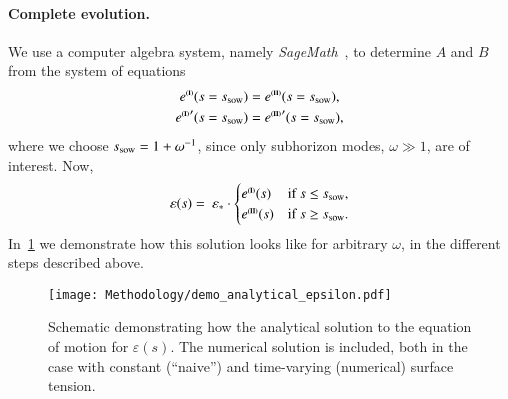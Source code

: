     \paragraph{Complete evolution.} %
    We use a computer algebra system, namely \textit{SageMath}~\citep{sagemath}, to determine $A$ and $B$ from the system of equations
    \begin{equation}
        \begin{split}
            e^{\text{{\tiny{\textbf{(I)}}}}}(s=s_\mathrm{sow}) &= e^{\text{{\tiny{\textbf{(II)}}}}}(s=s_\mathrm{sow}), \\
            {e^{\text{{\tiny{\textbf{(I)}}}}}}'(s=s_\mathrm{sow}) &= {e^{\text{{\tiny{\textbf{(II)}}}}}}'(s=s_\mathrm{sow}),
        \end{split}
    \end{equation}
    where we choose $s_\mathrm{sow}=1+\omega^{-1}$, since only subhorizon modes, $\omega\gg 1$, are of interest. Now,
    \begin{equation}\label{eq:pertwalls:mywalls:eps_s_complete_MD}
        \varepsilon(s) =  \epsast \cdot \begin{cases}
            e^{\text{\eqregimenum{I}}} (s)  &\text{if } s \leq s\ped{sow}, \\
            e^{\text{\eqregimenum{II}}}(s)  &\text{if }  s \geq s\ped{sow}.
        \end{cases}
    \end{equation}
    In~\cref{fig:pertwalls:mywalls:demo_analytical_epsilon} we demonstrate how this solution looks like for arbitrary $\omega$, in the different steps described above. %
    \begin{figure}[h]
        \centering
        \texttt{[image: Methodology/demo\_analytical\_epsilon.pdf]}
        \caption{Schematic demonstrating how the analytical solution to the equation of motion for $\varepsilon(s)$. The numerical solution is included, both in the case with constant (``naive'') and time-varying (numerical) surface tension.}  
        \label{fig:pertwalls:mywalls:demo_analytical_epsilon}
    \end{figure}

